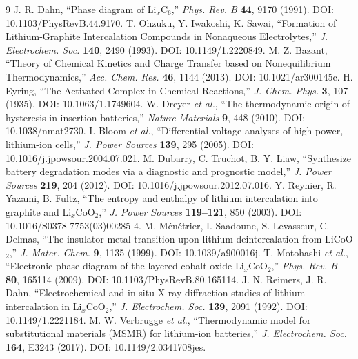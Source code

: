 \documentclass[11pt,a4paper]{article}
\begin{document}
\begin{thebibliography}{9}
 J. R. Dahn, ``Phase diagram of Li$_x$C$_6$,'' \emph{Phys. Rev. B} \textbf{44}, 9170 (1991). DOI: 10.1103/PhysRevB.44.9170.
 T. Ohzuku, Y. Iwakoshi, K. Sawai, ``Formation of Lithium-Graphite Intercalation Compounds in Nonaqueous Electrolytes,'' \emph{J. Electrochem. Soc.} \textbf{140}, 2490 (1993). DOI: 10.1149/1.2220849.
 M. Z. Bazant, ``Theory of Chemical Kinetics and Charge Transfer based on Nonequilibrium Thermodynamics,'' \emph{Acc. Chem. Res.} \textbf{46}, 1144 (2013). DOI: 10.1021/ar300145c.
 H. Eyring, ``The Activated Complex in Chemical Reactions,'' \emph{J. Chem. Phys.} \textbf{3}, 107 (1935). DOI: 10.1063/1.1749604.
 W. Dreyer \emph{et al.}, ``The thermodynamic origin of hysteresis in insertion batteries,'' \emph{Nature Materials} \textbf{9}, 448 (2010). DOI: 10.1038/nmat2730.
 I. Bloom \emph{et al.}, ``Differential voltage analyses of high-power, lithium-ion cells,'' \emph{J. Power Sources} \textbf{139}, 295 (2005). DOI: 10.1016/j.jpowsour.2004.07.021.
 M. Dubarry, C. Truchot, B. Y. Liaw, ``Synthesize battery degradation modes via a diagnostic and prognostic model,'' \emph{J. Power Sources} \textbf{219}, 204 (2012). DOI: 10.1016/j.jpowsour.2012.07.016.
 Y. Reynier, R. Yazami, B. Fultz, ``The entropy and enthalpy of lithium intercalation into graphite and Li$_x$CoO$_2$,'' \emph{J. Power Sources} \textbf{119--121}, 850 (2003). DOI: 10.1016/S0378-7753(03)00285-4.
 M. Ménétrier, I. Saadoune, S. Levasseur, C. Delmas, ``The insulator-metal transition upon lithium deintercalation from LiCoO$_2$,'' \emph{J. Mater. Chem.} \textbf{9}, 1135 (1999). DOI: 10.1039/a900016j.
 T. Motohashi \emph{et al.}, ``Electronic phase diagram of the layered cobalt oxide Li$_x$CoO$_2$,'' \emph{Phys. Rev. B} \textbf{80}, 165114 (2009). DOI: 10.1103/PhysRevB.80.165114.
 J. N. Reimers, J. R. Dahn, ``Electrochemical and in situ X-ray diffraction studies of lithium intercalation in Li$_x$CoO$_2$,'' \emph{J. Electrochem. Soc.} \textbf{139}, 2091 (1992). DOI: 10.1149/1.2221184.
 M. W. Verbrugge \emph{et al.}, ``Thermodynamic model for substitutional materials (MSMR) for lithium-ion batteries,'' \emph{J. Electrochem. Soc.} \textbf{164}, E3243 (2017). DOI: 10.1149/2.0341708jes.
\end{thebibliography}
\end{document}
